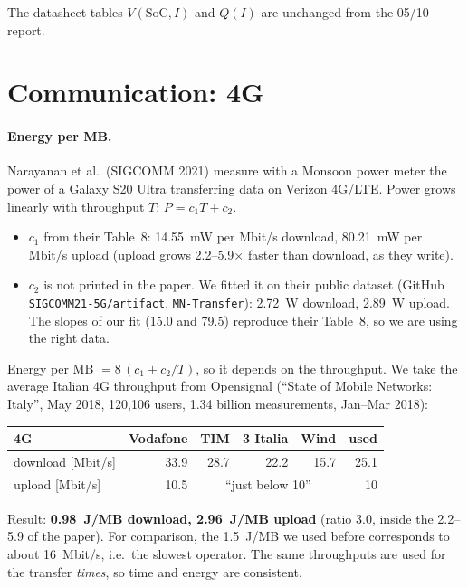 \documentclass[11pt,a4paper]{article}
\begin{document}
The datasheet tables $V(\mathrm{SoC}, I)$ and $Q(I)$ are unchanged from the
05/10 report.

\section{Communication: 4G}

\paragraph{Energy per MB.} Narayanan et al.\ (SIGCOMM 2021) measure with a
Monsoon power meter the power of a Galaxy S20 Ultra transferring data on
Verizon 4G/LTE. Power grows linearly with throughput $T$:
$P = c_1 T + c_2$.
\begin{itemize}
  \item $c_1$ from their Table~8: 14.55~mW per Mbit/s download,
        80.21~mW per Mbit/s upload (upload grows 2.2--5.9$\times$ faster
        than download, as they write).
  \item $c_2$ is not printed in the paper. We fitted it on their public
        dataset (GitHub \texttt{SIGCOMM21-5G/artifact}, \texttt{MN-Transfer}):
        2.72~W download, 2.89~W upload. The slopes of our fit (15.0 and 79.5)
        reproduce their Table~8, so we are using the right data.
\end{itemize}
Energy per MB $= 8\,(c_1 + c_2/T)$, so it depends on the throughput. We take
the average Italian 4G throughput from Opensignal (``State of Mobile Networks:
Italy'', May 2018, 120{,}106 users, 1.34 billion measurements, Jan--Mar 2018):

\begin{center}
\begin{tabular}{lrrrr|r}
\toprule
4G & Vodafone & TIM & 3 Italia & Wind & used \\
\midrule
download [Mbit/s] & 33.9 & 28.7 & 22.2 & 15.7 & 25.1 \\
upload [Mbit/s]   & 10.5 & \multicolumn{3}{c|}{``just below 10''} & 10 \\
\bottomrule
\end{tabular}
\end{center}

Result: \textbf{0.98~J/MB download, 2.96~J/MB upload} (ratio 3.0, inside the
2.2--5.9 of the paper). For comparison, the 1.5~J/MB we used before
corresponds to about 16~Mbit/s, i.e.\ the slowest operator. The same
throughputs are used for the transfer \emph{times}, so time and energy are
consistent.
\end{document}
